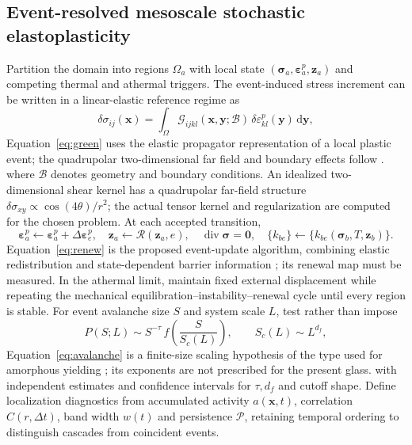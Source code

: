 \documentclass[11pt,a4paper]{article}
\newcommand{\dd}{\mathrm{d}}\newcommand{\avg}[1]{\left\langle #1\right\rangle}\newcommand{\Grad}{\operatorname{Grad}}
\begin{document}
\subsection{Event-resolved mesoscale stochastic elastoplasticity}
Partition the domain into regions $\Omega_a$ with local state $(\bm\sigma_a,\bm\varepsilon^p_a,\mathbf z_a)$ and competing thermal and athermal triggers. The event-induced stress increment can be written in a linear-elastic reference regime as
\begin{equation}
 \delta\sigma_{ij}(\mathbf x)=\int_\Omega
 \mathcal G_{ijkl}(\mathbf x,\mathbf y;\mathcal B)\,
 \delta\varepsilon^p_{kl}(\mathbf y)\,\dd\mathbf y,\label{eq:green}
\end{equation}
Equation~\eqref{eq:green} uses the elastic propagator representation of a local plastic event; the quadrupolar two-dimensional far field and boundary effects follow \cite{picard2004}.
where $\mathcal B$ denotes geometry and boundary conditions. An idealized two-dimensional shear kernel has a quadrupolar far-field structure $\delta\sigma_{xy}\propto\cos(4\theta)/r^2$; the actual tensor kernel and regularization are computed for the chosen problem. At each accepted transition,
\begin{equation}
 \bm\varepsilon^p_a\leftarrow\bm\varepsilon^p_a+\Delta\bm\varepsilon^p_e,\quad
 \mathbf z_a\leftarrow\mathcal R(\mathbf z_a,e),\quad
 \operatorname{div}\bm\sigma=\mathbf0,\quad
 \{k_{be}\}\leftarrow\{k_{be}(\bm\sigma_b,T,\mathbf z_b)\}.\label{eq:renew}
\end{equation}
Equation~\eqref{eq:renew} is the proposed event-update algorithm, combining elastic redistribution \cite{picard2004} and state-dependent barrier information \cite{sway2016}; its renewal map must be measured.
In the athermal limit, maintain fixed external displacement while repeating the mechanical equilibration--instability--renewal cycle until every region is stable. For event avalanche size $S$ and system scale $L$, test rather than impose
\begin{equation}
 P(S;L)\sim S^{-\tau}\,f\!\left(\frac{S}{S_c(L)}\right),\qquad S_c(L)\sim L^{d_f},\label{eq:avalanche}
\end{equation}
Equation~\eqref{eq:avalanche} is a finite-size scaling hypothesis of the type used for amorphous yielding \cite{lin2014}; its exponents are not prescribed for the present glass.
with independent estimates and confidence intervals for $\tau,d_f$ and cutoff shape. Define localization diagnostics from accumulated activity $a(\mathbf x,t)$, correlation $C(r,\Delta t)$, band width $w(t)$ and persistence $\mathcal P$, retaining temporal ordering to distinguish cascades from coincident events.
\end{document}
